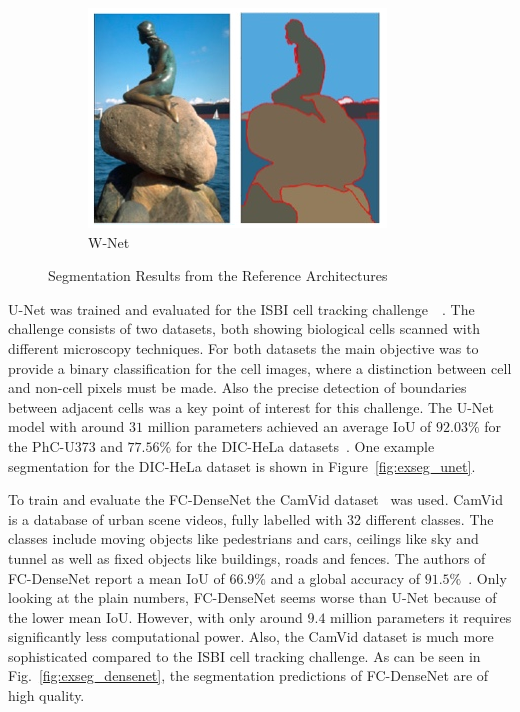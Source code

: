 \begin{figure}
\begin{subfigure}{0.21\textwidth}
        \includegraphics[width=\textwidth]{images/segmentation_example_wnet}
        \caption{W-Net~\cite{wnet17}}
        \label{fig:exseg_wnet}
    \end{subfigure}
    \hfill
    \caption{Segmentation Results from the Reference Architectures}
    \label{fig:segmentation_examples}
\end{figure}

U-Net was trained and evaluated for the ISBI cell tracking challenge~\cite{isbi_challenge_online}~\cite{isbi_challenge15}. The challenge consists of two datasets, both showing biological cells scanned with different microscopy techniques. For both datasets the main objective was to provide a binary classification for the cell images, where a distinction between cell and non-cell pixels must be made. Also the precise detection of boundaries between adjacent cells was a key point of interest for this challenge. The U-Net model with around $31$ million parameters achieved an average IoU of $92.03\%$ for the PhC-U373 and $77.56\%$ for the DIC-HeLa datasets~\cite{unet15}. One example segmentation for the DIC-HeLa dataset is shown in Figure~\ref{fig:exseg_unet}.

To train and evaluate the FC-DenseNet the CamVid dataset~\cite{camvid_challenge08} was used. CamVid is a database of urban scene videos, fully labelled with 32 different classes. The classes include moving objects like pedestrians and cars, ceilings like sky and tunnel as well as fixed objects like buildings, roads and fences. The authors of FC-DenseNet report a mean IoU of $66.9\%$ and a global accuracy of $91.5\%$~\cite{denseseg17}. Only looking at the plain numbers, FC-DenseNet seems worse than U-Net because of the lower mean IoU. However, with only around $9.4$ million parameters it requires significantly less computational power. Also, the CamVid dataset is much more sophisticated compared to the ISBI cell tracking challenge. As can be seen in Fig.~\ref{fig:exseg_densenet}, the segmentation predictions of FC-DenseNet are of high quality.

